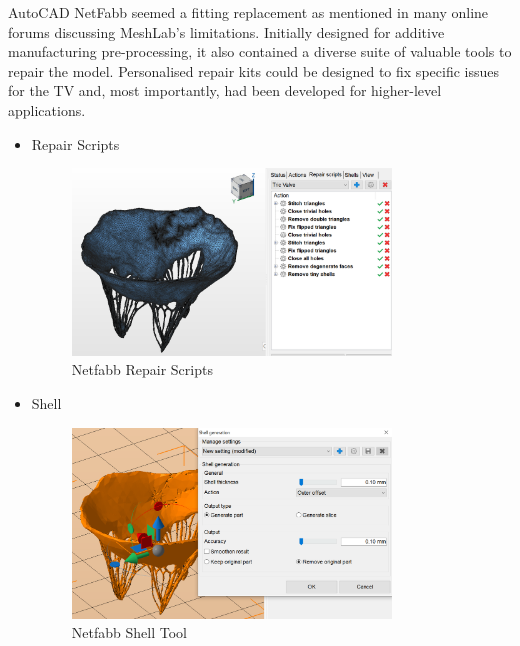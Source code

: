 AutoCAD NetFabb seemed a fitting replacement as mentioned in many online forums discussing MeshLab's limitations. Initially designed for additive manufacturing pre-processing, it also contained a diverse suite of valuable tools to repair the model. Personalised repair kits could be designed to fix specific issues for the \gls{TV} and, most importantly, had been developed for higher-level applications.
\begin{itemize}
    \item Repair Scripts
          \begin{figure}[H]
              \centering
              \includegraphics[width=0.8\textwidth]{figures/NetFabbRepair.png}
              \caption{Netfabb Repair Scripts}
              \label{fig:NetfabbRepair}
          \end{figure}
    \item Shell
          \begin{figure}[H]
              \centering
              \includegraphics[width=0.8\textwidth]{figures/NetFabbShell.png}
              \caption{Netfabb Shell Tool}
              \label{fig:NetfabbShell}
          \end{figure}
\end{itemize}


